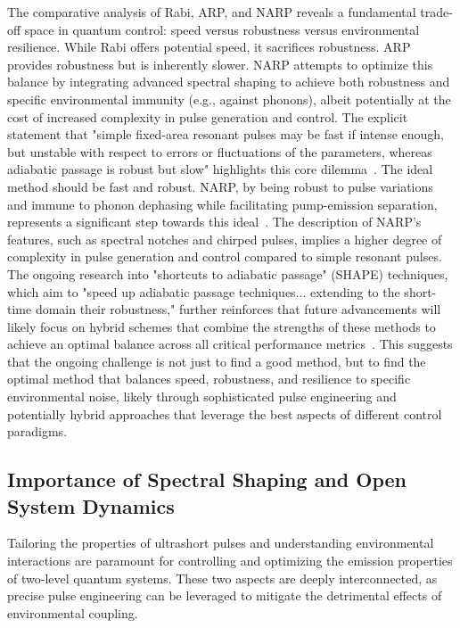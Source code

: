 \documentclass{article}
\begin{document}
The comparative analysis of Rabi, ARP, and NARP reveals a fundamental trade-off space in quantum control: speed versus robustness versus environmental resilience. While Rabi offers potential speed, it sacrifices robustness. ARP provides robustness but is inherently slower. NARP attempts to optimize this balance by integrating advanced spectral shaping to achieve both robustness and specific environmental immunity (e.g., against phonons), albeit potentially at the cost of increased complexity in pulse generation and control. The explicit statement that "simple fixed-area resonant pulses may be fast if intense enough, but unstable with respect to errors or fluctuations of the parameters, whereas adiabatic passage is robust but slow" highlights this core dilemma~\cite{Malinovsky2001GeneralTO}. The ideal method should be fast and robust. NARP, by being robust to pulse variations and immune to phonon dephasing while facilitating pump-emission separation, represents a significant step towards this ideal~\cite{Wilbur2022NotchfilteredAR}. The description of NARP's features, such as spectral notches and chirped pulses, implies a higher degree of complexity in pulse generation and control compared to simple resonant pulses. The ongoing research into "shortcuts to adiabatic passage" (SHAPE) techniques, which aim to "speed up adiabatic passage techniques... extending to the short-time domain their robustness," further reinforces that future advancements will likely focus on hybrid schemes that combine the strengths of these methods to achieve an optimal balance across all critical performance metrics~\cite{Malinovsky2001GeneralTO}. This suggests that the ongoing challenge is not just to find a good method, but to find the optimal method that balances speed, robustness, and resilience to specific environmental noise, likely through sophisticated pulse engineering and potentially hybrid approaches that leverage the best aspects of different control paradigms.

\subsection{Importance of Spectral Shaping and Open System Dynamics}
Tailoring the properties of ultrashort pulses and understanding environmental interactions are paramount for controlling and optimizing the emission properties of two-level quantum systems. These two aspects are deeply interconnected, as precise pulse engineering can be leveraged to mitigate the detrimental effects of environmental coupling.
\end{document}
